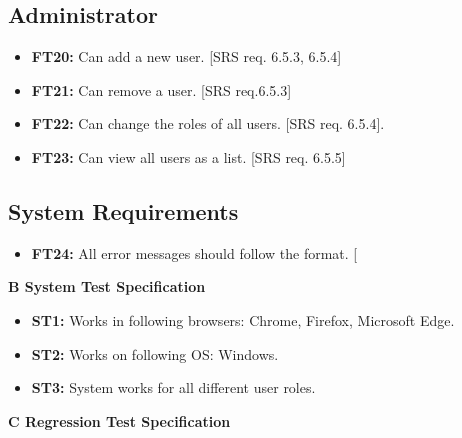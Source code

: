 \documentclass{article}
\begin{document}
		\subsection{Administrator}
		
			\begin{itemize}
  			\item \textbf{FT20:} Can add a new user. [SRS req. 6.5.3, 6.5.4]

  			\item \textbf{FT21:} Can remove a user. [SRS req.6.5.3]
  			
  			\item \textbf{FT22:} Can change the roles of all users. [SRS req. 6.5.4].
  			
  			\item \textbf{FT23:} Can view all users as a list. [SRS req. 6.5.5]

		\end{itemize}
		
		\subsection{System Requirements }
		
		\begin{itemize}
  			\item \textbf{FT24:} All error messages should follow the format. [

		\end{itemize}
		
		\newpage
		\begin{flushleft}
		{\large \textbf{B System Test Specification}}
		\end{flushleft}
		
		
		
		\begin{itemize}
		
  			\item \textbf{ST1:} Works in following browsers: Chrome, Firefox, Microsoft Edge.  
  			
  			\item \textbf{ST2:} Works on following OS: Windows.	 			
  			
  			\item \textbf{ST3:} System works for all different user roles. 

  			
		\end{itemize}
		
		\newpage
		\begin{flushleft}
		{\large \textbf{C Regression Test Specification}}
		\end{flushleft}
			
\end{document}
